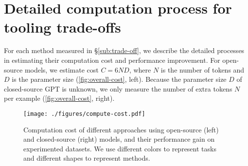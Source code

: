 \section{Detailed computation process for tooling trade-offs}
\label{app:learning-effort}

For each method measured in \S\ref{sub:trade-off}, we describe the detailed processes in estimating their computation cost and performance improvement. 
For open-source models, we estimate cost $C = 6ND$, where $N$ is the number of tokens and $D$ is the parameter size (\autoref{fig:overall-cost}, left). Because the parameter size $D$ of closed-source GPT is unknown, we only measure the number of extra tokens $N$ per example (\autoref{fig:overall-cost}, right). 


\begin{figure}[ht]
\centering
\texttt{[image: ./figures/compute-cost.pdf]}
\vspace{-6mm}
\caption{Computation cost of different approaches using open-source (left) and closed-source (right) models, and their performance gain on experimented datasets. We use different colors to represent tasks and different shapes to represent methods.}
\label{fig:overall-cost}
\end{figure}



